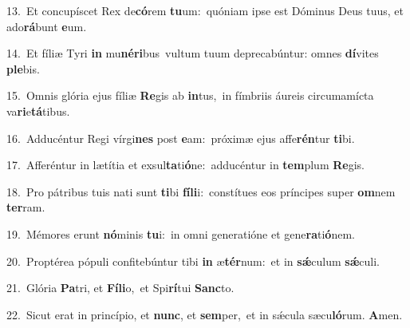 {\numbfont\textcolor{\numbcolor}{13.}}~Et concupíscet Rex de\-\textbf{có}\-rem \textbf{tu}\-um:~\star quóniam ipse est Dóminus Deus tuus, et ado\-\textbf{rá}\-bunt \textbf{e}\-um.\par
{\numbfont\textcolor{\numbcolor}{14.}}~Et fíliæ Tyri \textbf{in} mu\-\textbf{né}\-\textbf{ri}bus~\star vultum tuum deprecabúntur: omnes \textbf{dí}\-vites \textbf{ple}\-bis.\par
{\numbfont\textcolor{\numbcolor}{15.}}~Omnis glória ejus fíliæ \textbf{Re}\-gis ab \textbf{in}\-tus,~\star in fímbriis áureis circumamícta va\-\textbf{ri}\-e\-\textbf{tá}\-tibus.\par
{\numbfont\textcolor{\numbcolor}{16.}}~Adducéntur Regi vírgi\textbf{nes} post \textbf{e}\-am:~\star próximæ ejus affe\-\textbf{rén}\-tur \textbf{ti}\-bi.\par
{\numbfont\textcolor{\numbcolor}{17.}}~Afferéntur in lætítia et exsul\-\textbf{ta}\-ti\-\textbf{ó}\-ne:~\star adducéntur in \textbf{tem}\-plum \textbf{Re}\-gis.\par
{\numbfont\textcolor{\numbcolor}{18.}}~Pro pátribus tuis nati sunt \textbf{ti}\-bi \textbf{fí}\-\textbf{li}i:~\star constítues eos príncipes super \textbf{om}\-nem \textbf{ter}\-ram.\par
{\numbfont\textcolor{\numbcolor}{19.}}~Mémores erunt \textbf{nó}\-minis \textbf{tu}\-i:~\star in omni generatióne et gene\-\textbf{ra}\-ti\-\textbf{ó}\-nem.\par
{\numbfont\textcolor{\numbcolor}{20.}}~Proptérea pópuli confitebúntur tibi \textbf{in} æ\-\textbf{tér}\-num:~\star et in \textbf{sǽ}\-culum \textbf{sǽ}\-culi.\par
{\numbfont\textcolor{\numbcolor}{21.}}~Glória \textbf{Pa}\-tri, et \textbf{Fí}\-\textbf{li}o,~\star et Spi\-\textbf{rí}\-tui \textbf{Sanc}\-to.\par
{\numbfont\textcolor{\numbcolor}{22.}}~Sicut erat in princípio, et \textbf{nunc}\-, et \textbf{sem}\-per,~\star et in sǽcula sæcu\-\textbf{ló}\-rum. \textbf{A}\-men.\par
